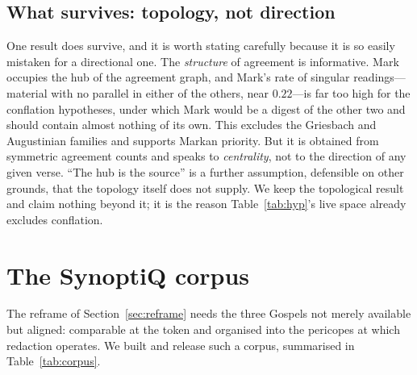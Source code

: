 \documentclass[11pt,letterpaper]{article}
\begin{document}
\subsection{What survives: topology, not direction}
\label{sec:topology}

One result does survive, and it is worth stating carefully because it is so easily mistaken for a directional one. The \emph{structure} of agreement is informative. Mark occupies the hub of the agreement graph, and Mark's rate of singular readings---material with no parallel in either of the others, near $0.22$---is far too high for the conflation hypotheses, under which Mark would be a digest of the other two and should contain almost nothing of its own. This excludes the Griesbach and Augustinian families and supports Markan priority. But it is obtained from symmetric agreement counts and speaks to \emph{centrality}, not to the direction of any given verse. ``The hub is the source'' is a further assumption, defensible on other grounds, that the topology itself does not supply. We keep the topological result and claim nothing beyond it; it is the reason Table~\ref{tab:hyp}'s live space already excludes conflation.

\section{The SynoptiQ corpus}
\label{sec:corpus}

The reframe of Section~\ref{sec:reframe} needs the three Gospels not merely available but aligned: comparable at the token and organised into the pericopes at which redaction operates. We built and release such a corpus, summarised in Table~\ref{tab:corpus}.
\end{document}
